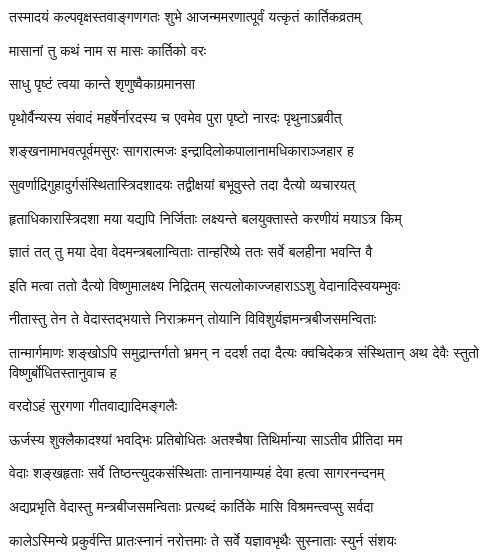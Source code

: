 \twolineshloka
{तस्मादयं कल्पवृक्षस्तवाङ्गणगतः शुभे}
{आजन्ममरणात्पूर्वं यत्कृतं कार्तिकव्रतम्} %




\onelineshloka
{मासानां तु कथं नाम स मासः कार्तिको वरः} %




\onelineshloka
{साधु पृष्टं त्वया कान्ते शृणुष्वैकाग्रमानसा} %

\twolineshloka
{पृथोर्वैन्यस्य संवादं महर्षेर्नारदस्य च}
{एवमेव पुरा पृष्टो नारदः पृथुनाऽब्रवीत्} %


\twolineshloka
{शङ्खनामाभवत्पूर्वमसुरः सागरात्मजः}
{इन्द्रादिलोकपालानामधिकाराञ्जहार ह} %

\twolineshloka
{सुवर्णाद्रिगुहादुर्गसंस्थितास्त्रिदशादयः}
{तद्वीक्षयां बभूवुस्ते तदा दैत्यो व्यचारयत्} %

\twolineshloka
{हृताधिकारास्त्रिदशा मया यद्यपि निर्जिताः}
{लक्ष्यन्ते बलयुक्तास्ते करणीयं मयाऽत्र किम्} %

\twolineshloka
{ज्ञातं तत् तु मया देवा वेदमन्त्रबलान्विताः}
{तान्हरिष्ये ततः सर्वे बलहीना भवन्ति वै} %

\twolineshloka
{इति मत्वा ततो दैत्यो विष्णुमालक्ष्य निद्रितम्}
{सत्यलोकाज्जहाराऽऽशु वेदानादिस्वयम्भुवः} %

\twolineshloka
{नीतास्तु तेन ते वेदास्तद्भयात्ते निराक्रमन्}
{तोयानि विविशुर्यज्ञमन्त्रबीजसमन्विताः} %

\threelineshloka
{तान्मार्गमाणः शङ्खोऽपि समुद्रान्तर्गतो भ्रमन्}
{न ददर्श तदा दैत्यः क्वचिदेकत्र संस्थितान्}
{अथ देवैः स्तुतो विष्णुर्बोधितस्तानुवाच ह} %



\onelineshloka
{वरदोऽहं सुरगणा गीतवाद्यादिमङ्गलैः} %

\twolineshloka
{ऊर्जस्य शुक्लैकादश्यां भवद्भिः प्रतिबोधितः}
{अतश्चैषा तिथिर्मान्या साऽतीव प्रीतिदा मम} %

\twolineshloka
{वेदाः शङ्खहृताः सर्वे तिष्ठन्त्युदकसंस्थिताः}
{तानानयाम्यहं देवा हत्वा सागरनन्दनम्} %

\twolineshloka
{अद्यप्रभृति वेदास्तु मन्त्रबीजसमन्विताः}
{प्रत्यब्दं कार्तिके मासि विश्रमन्त्वप्सु सर्वदा} %

\twolineshloka
{कालेऽस्मिन्ये प्रकुर्वन्ति प्रातःस्नानं नरोत्तमाः}
{ते सर्वे यज्ञावभृथैः सुस्नाताः स्युर्न संशयः} %

